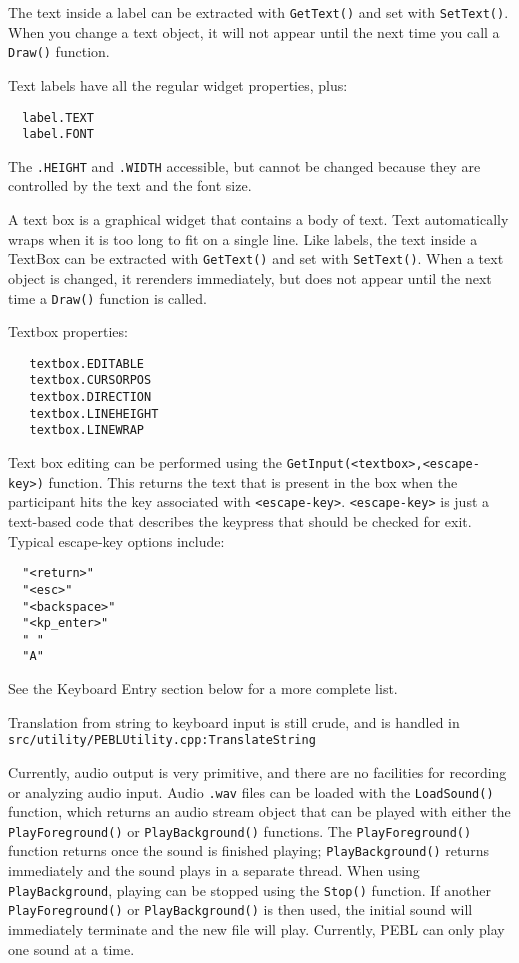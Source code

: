The text inside a label can be extracted with \texttt{GetText()} 
and set with \texttt{SetText()}. When you change a text object, 
it will not appear until the next time you call a \texttt{Draw()} function.

Text labels have all the regular widget properties, plus:
\begin{verbatim}
  label.TEXT 
  label.FONT
\end{verbatim}
  


The \verb+.HEIGHT+ and \verb+.WIDTH+ accessible, but cannot be changed
because they are controlled by the text and the font size.



A text box is a graphical widget that contains a body of text.  Text
automatically wraps when it is too long to fit on a single line.  Like
labels, the text inside a TextBox can be extracted with
\texttt{GetText()} and set with \texttt{SetText()}. When a text object
is changed, it rerenders immediately, but does not appear until the
next time a \texttt{Draw()} function is called.


Textbox properties:
\begin{verbatim}
   textbox.EDITABLE
   textbox.CURSORPOS 
   textbox.DIRECTION
   textbox.LINEHEIGHT
   textbox.LINEWRAP
\end{verbatim}
 



Text box editing can be performed using the \verb+GetInput(<textbox>,<escape-key>)+ function.  This returns the text that is present in the box when the participant hits the key associated with \verb+<escape-key>+.  
\verb+<escape-key>+ is just a text-based code that describes the keypress 
that should be checked for exit. Typical escape-key options include:
\begin{verbatim}
  "<return>"
  "<esc>"
  "<backspace>"
  "<kp_enter>"
  " "
  "A"
\end{verbatim}
 
See the Keyboard Entry section below for a more complete list.

Translation from string to keyboard input is still crude, 
and is handled in \texttt{src/utility/PEBLUtility.cpp:TranslateString} 

\newpage
{}

Currently, audio output is very primitive, and there are no facilities for recording or analyzing audio input. Audio \texttt{.wav} files can be loaded with the \texttt{LoadSound()} function, which returns an audio stream object that can be played  with either the \texttt{PlayForeground()} or \texttt{PlayBackground()} functions.  
The \texttt{PlayForeground()} function returns once the sound is finished playing; \texttt{PlayBackground()} returns immediately and the sound plays in a separate thread.  When using \texttt{PlayBackground}, playing can be stopped using the \texttt{Stop()} function.  If another \texttt{PlayForeground()} or \texttt{PlayBackground()} is then used,
the initial sound will immediately terminate and the new file will play. Currently, PEBL can only play one sound at a time.

